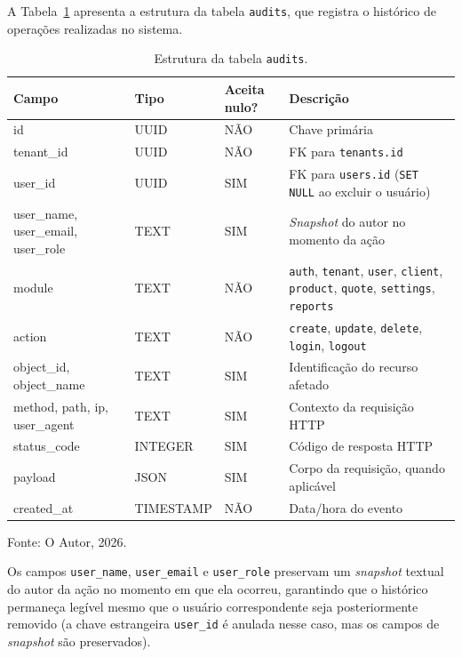 A Tabela~\ref{tab:tabela-audits} apresenta a estrutura da tabela \texttt{audits}, que registra o histórico de operações realizadas no sistema.

\begin{table}[H]
  \centering
  \caption{Estrutura da tabela \texttt{audits}.}
  \label{tab:tabela-audits}
  \begin{tabular}{p{3.1cm}p{2.3cm}p{1.6cm}p{5.7cm}}
    \hline
    \textbf{Campo} & \textbf{Tipo} & \textbf{Aceita nulo?} & \textbf{Descrição} \\
    \hline
    id & UUID & NÃO & Chave primária \\
    tenant\_id & UUID & NÃO & FK para \texttt{tenants.id} \\
    user\_id & UUID & SIM & FK para \texttt{users.id} (\texttt{SET NULL} ao excluir o usuário) \\
    user\_name, user\_email, user\_role & TEXT & SIM & \textit{Snapshot} do autor no momento da ação \\
    module & TEXT & NÃO & \texttt{auth}, \texttt{tenant}, \texttt{user}, \texttt{client}, \texttt{product}, \texttt{quote}, \texttt{settings}, \texttt{reports} \\
    action & TEXT & NÃO & \texttt{create}, \texttt{update}, \texttt{delete}, \texttt{login}, \texttt{logout} \\
    object\_id, object\_name & TEXT & SIM & Identificação do recurso afetado \\
    method, path, ip, user\_agent & TEXT & SIM & Contexto da requisição HTTP \\
    status\_code & INTEGER & SIM & Código de resposta HTTP \\
    payload & JSON & SIM & Corpo da requisição, quando aplicável \\
    created\_at & TIMESTAMP & NÃO & Data/hora do evento \\
    \hline
  \end{tabular}
  \begin{minipage}{0.95\textwidth}
    \vspace{0.3em}
    {\small Fonte: O Autor, 2026.}
  \end{minipage}
\end{table}

Os campos \texttt{user\_name}, \texttt{user\_email} e \texttt{user\_role} preservam um \textit{snapshot} textual do autor da ação no momento em que ela ocorreu, garantindo que o histórico permaneça legível mesmo que o usuário correspondente seja posteriormente removido (a chave estrangeira \texttt{user\_id} é anulada nesse caso, mas os campos de \textit{snapshot} são preservados).

